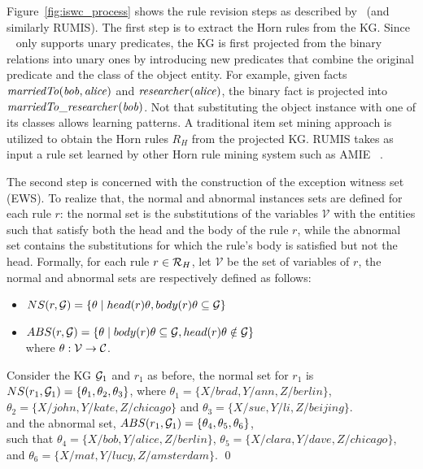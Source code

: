 Figure~\ref{fig:iswc_process} shows the rule revision steps as described by~\cite{gad2016} (and similarly RUMIS). The first step is to extract the Horn rules from the KG. Since ~\cite{gad2016} only supports unary predicates, the KG is first projected from the binary relations into unary ones by introducing new predicates that combine the original predicate and the class of the object entity. For example, given facts $\mathit{marriedTo(bob, alice)}$ and $\mathit{researcher(alice)}$, the binary fact is projected into $\mathit{marriedTo\_researcher(bob)}$. Not that substituting the object instance with one of its classes allows learning patterns. A traditional item set mining approach is utilized to obtain the Horn rules $R_H$ from the projected KG. RUMIS takes as input a rule set learned by other Horn rule mining system such as AMIE ~\cite{amie}.   


The second step is concerned with the construction of the exception witness set (EWS). To realize that, the normal and abnormal instances sets are defined for each rule $r$: the normal set is the substitutions of the variables $\mathcal{V}$ with the entities such that satisfy both the head and the body of the rule $r$, while the abnormal set contains the  substitutions for which the rule's  body is satisfied but not the head.
Formally, for each rule $r \in \mathcal{R}_H$, let $\mathcal{V}$ be the set of variables of $r$, the normal and abnormal sets are respectively defined as follows:
\begin{itemize}
\item $NS(r, \mathcal{G}) = \{\theta \mid head(r)\theta, body(r)\theta \subseteq \mathcal{G}\}$
\item $ABS(r, \mathcal{G}) = \{\theta \mid body(r)\theta \subseteq \mathcal{G} , head(r)\theta \notin \mathcal{G}\}$\\
where $\theta: \mathcal{V} \rightarrow \mathcal{C}$.
\end{itemize}

\begin{example}
Consider the KG $\mathcal{G}_1$ and $r_1$ as before, the normal set for $r_1$ is $NS(r_1,\mathcal{G}_1)=\{\theta_1, \theta_2 ,\theta_3\}$, where $\theta_1 = \{X/brad, Y/ann, Z/berlin\}$,\\  $\theta_2 = \{X/john, Y/kate, Z/chicago\}$ and $\theta_3 = \{X/sue, Y/li, Z/beijing\}$.\\ and the abnormal set, $ABS(r_1,\mathcal{G}_1)=\{\theta_4,\theta_5, \theta_6\}$, \\such that $\theta_4=\{X/bob, Y/alice, Z/berlin\}$,  $\theta_5=\{X/clara, Y/dave, Z/chicago\}$, and $\theta_6=\{X/mat, Y/lucy, Z/amsterdam\}$.
\qed
\end{example}

